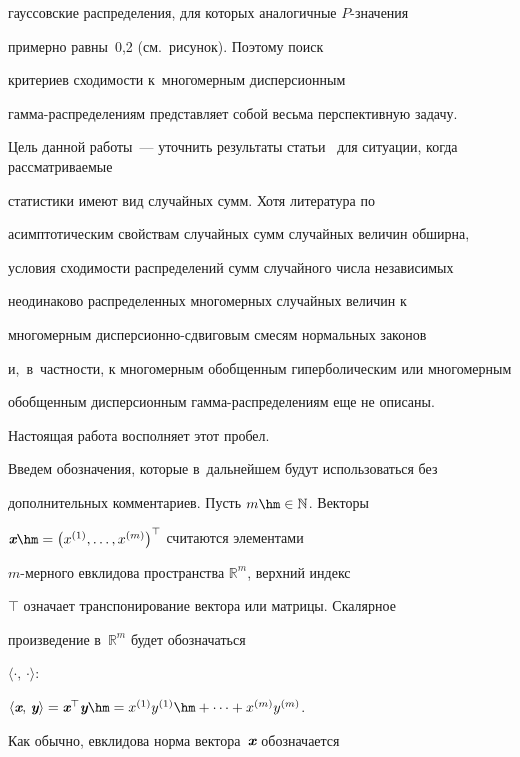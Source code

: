 гауссовские распределения, для которых аналогичные $P$-зна\-че\-ния


примерно равны~0,2 (см.\ рисунок). Поэтому поиск


критериев сходимости к~многомерным дисперсионным


гам\-ма-рас\-пре\-де\-ле\-ни\-ям представляет собой весьма перспективную задачу.














Цель данной работы~--- уточнить результаты статьи~\cite{KorolevZeifman2014} для ситуации, когда рассматриваемые


статистики имеют вид случайных сумм. Хотя литература по


асимптотическим свойствам случайных сумм случайных величин обширна,


условия сходимости распределений сумм случайного числа независимых


неодинаково распределенных многомерных случайных величин к


многомерным дис\-пер\-си\-он\-но-сдви\-го\-вым смесям нормальных законов


и,~в~частности, к многомерным обобщенным гиперболическим или многомерным


обобщенным дисперсионным гам\-ма-рас\-пре\-де\-ле\-ни\-ям еще не описаны.


Настоящая работа восполняет этот пробел.





Введем обозначения, которые в~дальнейшем будут использоваться без


дополнительных комментариев. Пусть $m\hm\in\mathbb{N}$. Векторы


$\vx\hm=\left(x^{(1)},\ldots,x^{(m)}\right)^{\top}$ считаются элементами


$m$-мерного евклидова пространства $\mathbb{R}^m$, верхний индекс


${\top}$ означает транспонирование вектора или матрицы. Скалярное


произведение в~$\mathbb{R}^m$ будет обозначаться


$\langle\cdot,\,\cdot\rangle$:


$\langle\vx,\,\vy\rangle=\vx^{\top}\vy\hm=x^{(1)}y^{(1)}\hm+\cdots+x^{(m)}y^{(m)}$.


Как обычно, евклидова норма вектора~$\emph{\textbf{x}}$ обозначается


